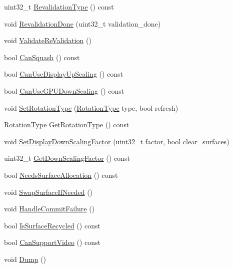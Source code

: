 \begin{DoxyCompactItemize}
\item 
uint32\+\_\+t \mbox{\hyperlink{classhwcomposer_1_1DisplayPlaneState_a1df1d57e6ec6d9c79d520c5f9b48f8c3}{Revalidation\+Type}} () const
\item 
void \mbox{\hyperlink{classhwcomposer_1_1DisplayPlaneState_aed4135ad5bbd3274d2729f8984b25549}{Revalidation\+Done}} (uint32\+\_\+t validation\+\_\+done)
\item 
void \mbox{\hyperlink{classhwcomposer_1_1DisplayPlaneState_abe1d277b77a97323c588993484312dd3}{Validate\+Re\+Validation}} ()
\item 
bool \mbox{\hyperlink{classhwcomposer_1_1DisplayPlaneState_a2ac64be5259b1970748f2904cd9fb9ad}{Can\+Squash}} () const
\item 
bool \mbox{\hyperlink{classhwcomposer_1_1DisplayPlaneState_a1bf41f47af43cae6b25f4e69c117f31b}{Can\+Use\+Display\+Up\+Scaling}} () const
\item 
bool \mbox{\hyperlink{classhwcomposer_1_1DisplayPlaneState_a0388118f03e5d1504565fa72150a7d98}{Can\+Use\+G\+P\+U\+Down\+Scaling}} () const
\item 
void \mbox{\hyperlink{classhwcomposer_1_1DisplayPlaneState_a47bb9fccfaf18b5eeacd2a5142cb3910}{Set\+Rotation\+Type}} (\mbox{\hyperlink{classhwcomposer_1_1DisplayPlaneState_a907c53d6739ccbfb5058a0f34f3de657}{Rotation\+Type}} type, bool refresh)
\item 
\mbox{\hyperlink{classhwcomposer_1_1DisplayPlaneState_a907c53d6739ccbfb5058a0f34f3de657}{Rotation\+Type}} \mbox{\hyperlink{classhwcomposer_1_1DisplayPlaneState_a952636f7cf311678e40ad2b85812f2f0}{Get\+Rotation\+Type}} () const
\item 
void \mbox{\hyperlink{classhwcomposer_1_1DisplayPlaneState_a5ab29e4685340c83b8c71bfffc5adbba}{Set\+Display\+Down\+Scaling\+Factor}} (uint32\+\_\+t factor, bool clear\+\_\+surfaces)
\item 
uint32\+\_\+t \mbox{\hyperlink{classhwcomposer_1_1DisplayPlaneState_ab4e0c78ad49efbe3c0b3853ebe4d0489}{Get\+Down\+Scaling\+Factor}} () const
\item 
bool \mbox{\hyperlink{classhwcomposer_1_1DisplayPlaneState_ac4f2030aecdb55059e7177597f5887d6}{Needs\+Surface\+Allocation}} () const
\item 
void \mbox{\hyperlink{classhwcomposer_1_1DisplayPlaneState_a7f6188cc61cbe9897f7f6ea7bc5979f9}{Swap\+Surface\+If\+Needed}} ()
\item 
void \mbox{\hyperlink{classhwcomposer_1_1DisplayPlaneState_a1459f66800f0c8a2dd2f466b3c8b41d1}{Handle\+Commit\+Failure}} ()
\item 
bool \mbox{\hyperlink{classhwcomposer_1_1DisplayPlaneState_ae87c91a3015833eb4882e42276d55925}{Is\+Surface\+Recycled}} () const
\item 
bool \mbox{\hyperlink{classhwcomposer_1_1DisplayPlaneState_a4769a056f7c76cb1e3fadf0269ff399d}{Can\+Support\+Video}} () const
\item 
void \mbox{\hyperlink{classhwcomposer_1_1DisplayPlaneState_a620538eec4a6a5dbfd62c5ddb697d95d}{Dump}} ()
\end{DoxyCompactItemize}


